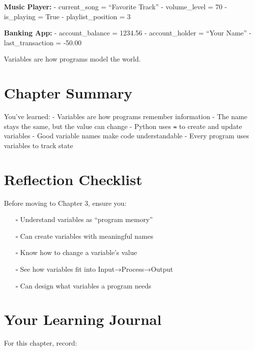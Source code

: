\documentclass[
  letterpaper,
  DIV=11,
  numbers=noendperiod,
  oneside]{scrreprt}
\providecommand{\tightlist}{%
  \setlength{\itemsep}{0pt}\setlength{\parskip}{0pt}}\usepackage{longtable,booktabs,array}
\begin{document}
\textbf{Music Player:} - current\_song = ``Favorite Track'' -
volume\_level = 70 - is\_playing = True - playlist\_position = 3

\textbf{Banking App:} - account\_balance = 1234.56 - account\_holder =
``Your Name'' - last\_transaction = -50.00

Variables are how programs model the world.

\section{Chapter Summary}\label{chapter-summary-2}

You've learned: - Variables are how programs remember information - The
name stays the same, but the value can change - Python uses \texttt{=}
to create and update variables - Good variable names make code
understandable - Every program uses variables to track state

\section{Reflection Checklist}\label{reflection-checklist-1}

Before moving to Chapter 3, ensure you:

\begin{itemize}
\tightlist
\item[$\square$]
  Understand variables as ``program memory''
\item[$\square$]
  Can create variables with meaningful names
\item[$\square$]
  Know how to change a variable's value
\item[$\square$]
  See how variables fit into Input→Process→Output
\item[$\square$]
  Can design what variables a program needs
\end{itemize}

\section{Your Learning Journal}\label{your-learning-journal-2}

For this chapter, record:
\end{document}

